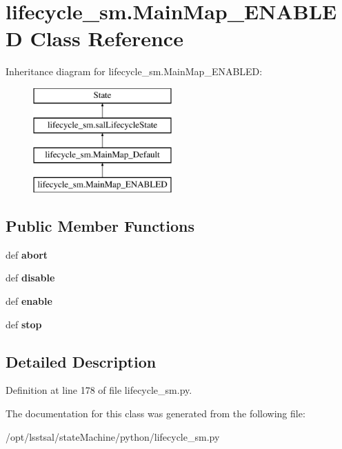 \hypertarget{classlifecycle__sm_1_1_main_map___e_n_a_b_l_e_d}{\section{lifecycle\-\_\-sm.\-Main\-Map\-\_\-\-E\-N\-A\-B\-L\-E\-D Class Reference}
\label{classlifecycle__sm_1_1_main_map___e_n_a_b_l_e_d}
}
Inheritance diagram for lifecycle\-\_\-sm.\-Main\-Map\-\_\-\-E\-N\-A\-B\-L\-E\-D\-:\begin{figure}[H]
\begin{center}
\leavevmode
\includegraphics[height=4.000000cm]{classlifecycle__sm_1_1_main_map___e_n_a_b_l_e_d}
\end{center}
\end{figure}
\subsection*{Public Member Functions}
\begin{DoxyCompactItemize}
\item 
\hypertarget{classlifecycle__sm_1_1_main_map___e_n_a_b_l_e_d_a139d39b2d763e97ebdfb2bece4e8bde7}{def {\bfseries abort}}\label{classlifecycle__sm_1_1_main_map___e_n_a_b_l_e_d_a139d39b2d763e97ebdfb2bece4e8bde7}

\item 
\hypertarget{classlifecycle__sm_1_1_main_map___e_n_a_b_l_e_d_aa54120f70e5f9dc8365e2d208add5ab9}{def {\bfseries disable}}\label{classlifecycle__sm_1_1_main_map___e_n_a_b_l_e_d_aa54120f70e5f9dc8365e2d208add5ab9}

\item 
\hypertarget{classlifecycle__sm_1_1_main_map___e_n_a_b_l_e_d_a43220b6cfb296e96453dafd5519cc325}{def {\bfseries enable}}\label{classlifecycle__sm_1_1_main_map___e_n_a_b_l_e_d_a43220b6cfb296e96453dafd5519cc325}

\item 
\hypertarget{classlifecycle__sm_1_1_main_map___e_n_a_b_l_e_d_a663c27a9d10d409ad5f1b95702c78d5f}{def {\bfseries stop}}\label{classlifecycle__sm_1_1_main_map___e_n_a_b_l_e_d_a663c27a9d10d409ad5f1b95702c78d5f}

\end{DoxyCompactItemize}


\subsection{Detailed Description}


Definition at line 178 of file lifecycle\-\_\-sm.\-py.



The documentation for this class was generated from the following file\-:\begin{DoxyCompactItemize}
\item 
/opt/lsstsal/state\-Machine/python/lifecycle\-\_\-sm.\-py\end{DoxyCompactItemize}
